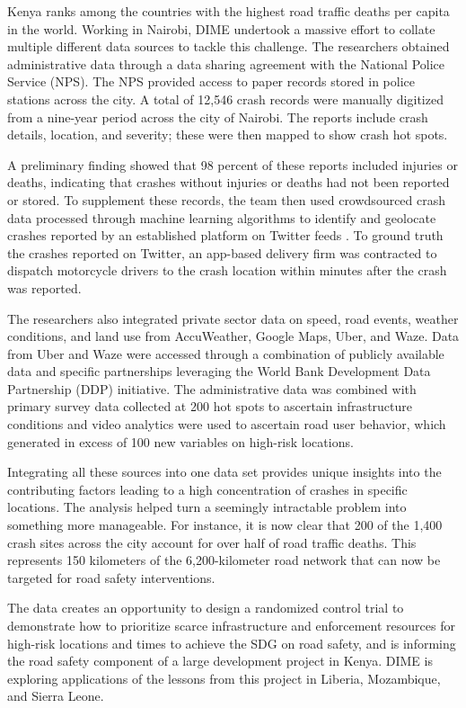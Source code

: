 Kenya ranks among the countries with the highest road traffic deaths per capita in the world. Working in Nairobi, DIME undertook a massive effort to collate multiple different data sources to tackle this challenge. The researchers obtained administrative data through a data sharing agreement with the National Police Service (NPS). The NPS provided access to paper records stored in police stations across the city. A total of 12,546 crash records were manually digitized from a nine-year period across the city of Nairobi. The reports include crash details, location, and severity; these were then mapped to show crash hot spots. 

A preliminary finding showed that 98 percent of these reports included injuries or deaths, indicating that crashes without injuries or deaths had not been reported or stored. To supplement these records, the team then used crowdsourced crash data processed through machine learning algorithms to identify and geolocate crashes reported by an established platform on Twitter feeds \citep{milusheva2020}. To ground truth the crashes reported on Twitter, an app-based delivery firm was contracted to dispatch motorcycle drivers to the crash location within minutes after the crash was reported. 

The researchers also integrated private sector data on speed, road events, weather conditions, and land use from AccuWeather, Google Maps, Uber, and Waze. Data from Uber and Waze were accessed through a combination of publicly available data and specific partnerships leveraging the World Bank Development Data Partnership (DDP) initiative. The administrative data was combined with primary survey data collected at 200 hot spots to ascertain infrastructure conditions and video analytics were used to ascertain road user behavior, which generated in excess of 100 new variables on high-risk locations.

Integrating all these sources into one data set provides unique insights into the contributing factors leading to a high concentration of crashes in specific locations. The analysis helped turn a seemingly intractable problem into something more manageable. For instance, it is now clear that 200 of the 1,400 crash sites across the city account for over half of road traffic deaths. This represents 150 kilometers of the 6,200-kilometer road network that can now be targeted for road safety interventions. 

The data creates an opportunity to design a randomized control trial to demonstrate how to prioritize scarce infrastructure and enforcement resources for high-risk locations and times to achieve the SDG on road safety, and is informing the road safety component of a large development project in Kenya. DIME is exploring applications of the lessons from this project in Liberia, Mozambique, and Sierra Leone.


